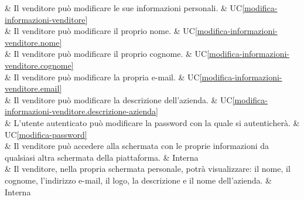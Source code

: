  & Il venditore può modificare le sue informazioni personali. & UC\ref{modifica-informazioni-venditore} \\
	
 & Il venditore può modificare il proprio nome. & UC\ref{modifica-informazioni-venditore.nome} \\
	
 & Il venditore può modificare il proprio cognome. & UC\ref{modifica-informazioni-venditore.cognome} \\
	
 & Il venditore può modificare la propria e-mail. & UC\ref{modifica-informazioni-venditore.email} \\
	
 & Il venditore può modificare la descrizione dell'azienda. & UC\ref{modifica-informazioni-venditore.descrizione-azienda} \\

 & L'utente autenticato può modificare la password con la quale si autenticherà. & UC\ref{modifica-password} \\

 & Il venditore può accedere alla schermata con le proprie informazioni da qualsiasi altra schermata della piattaforma. & Interna \\
	
 & Il venditore, nella propria schermata personale, potrà visualizzare: il nome, il cognome, l'indirizzo e-mail, il logo, la descrizione e il nome dell'azienda. & Interna \\ 